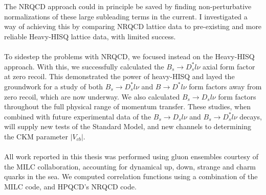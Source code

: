 \\ \\
The NRQCD approach could in principle be saved by finding non-perturbative normalizations of these large subleading terms in the current. I investigated a way of achieving this by comparing NRQCD lattice data to pre-existing and more reliable Heavy-HISQ lattice data, with limited success.
\\ \\
To sidestep the problems with NRQCD, we focused instead on the Heavy-HISQ approach. With this, we successfully calculated the $B_s\to D_s^*l\nu$ axial form factor at zero recoil. This demonstrated the power of heavy-HISQ and layed the groundwork for a study of both $B_s\to D_s^*l\nu$ and $B\to D^*l\nu$ form factors away from zero recoil, which are now underway. We also calculated $B_s\to D_sl\nu$ form factors throughout the full physical range of momentum transfer. These studies, when combined with future experimental data of the $B_s\to D_sl\nu$ and $B_s\to D_s^*l\nu$ decays, will supply new tests of the Standard Model, and new channels to determining the CKM parameter $|V_{cb}|$.
\\ \\
All work reported in this thesis was performed using gluon ensembles courtesy of the MILC collaboration, accounting for dynamical up, down, strange and charm quarks in the sea. We computed correlation functions using a combination of the MILC code, and HPQCD's NRQCD code.

